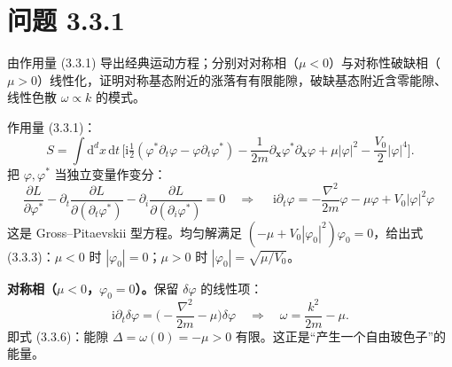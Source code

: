 \section*{问题 3.3.1}
\begin{problem}
由作用量 (3.3.1) 导出经典运动方程；分别对对称相（$\mu<0$）与对称性破缺相（$\mu>0$）线性化，证明对称基态附近的涨落有有限能隙，破缺基态附近含零能隙、线性色散 $\omega\propto k$ 的模式。
\end{problem}
\solution

作用量 (3.3.1)：
\begin{equation*}
S=\int\mathrm{d}^dx\,\mathrm{d}t\,
\Big[\mathrm{i}\tfrac12(\varphi^{*}\partial_t\varphi-\varphi\partial_t\varphi^{*})
-\frac{1}{2m}\partial_{\pmb{x}}\varphi^{*}\partial_{\pmb{x}}\varphi
+\mu|\varphi|^{2}-\frac{V_0}{2}|\varphi|^{4}\Big] .
\end{equation*}
把 $\varphi,\varphi^{*}$ 当独立变量作变分：
\begin{equation*}
\frac{\partial L}{\partial\varphi^{*}}-\partial_t\frac{\partial L}{\partial(\partial_t\varphi^{*})}
-\partial_i\frac{\partial L}{\partial(\partial_i\varphi^{*})}=0
\quad\Longrightarrow\quad
\boxed{\;\mathrm{i}\partial_t\varphi=-\frac{\nabla^{2}}{2m}\varphi-\mu\varphi+V_0|\varphi|^{2}\varphi\;}
\end{equation*}
这是 Gross--Pitaevskii 型方程。均匀解满足 $(-\mu+V_0|\varphi_0|^{2})\varphi_0=0$，给出式 (3.3.3)：$\mu<0$ 时 $|\varphi_0|=0$；$\mu>0$ 时 $|\varphi_0|=\sqrt{\mu/V_0}$。

\textbf{对称相（$\mu<0$，$\varphi_0=0$）。}保留 $\delta\varphi$ 的线性项：
\begin{equation*}
\mathrm{i}\partial_t\delta\varphi=\Big(-\frac{\nabla^{2}}{2m}-\mu\Big)\delta\varphi
\quad\Longrightarrow\quad
\omega=\frac{k^{2}}{2m}-\mu .
\end{equation*}
即式 (3.3.6)：能隙 $\Delta=\omega(0)=-\mu>0$ 有限。这正是“产生一个自由玻色子”的能量。

